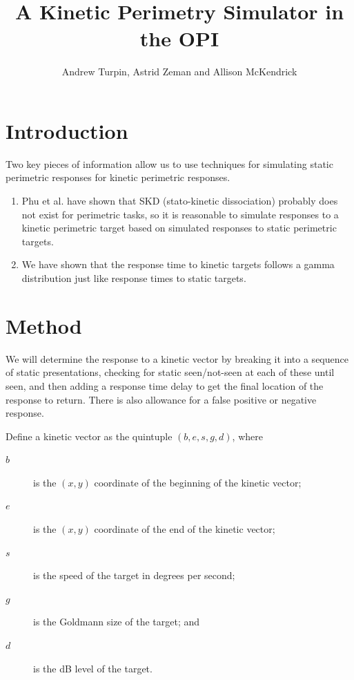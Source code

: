 \documentclass{article}
\title{A Kinetic Perimetry Simulator in the OPI}
\author{Andrew Turpin, Astrid Zeman and Allison McKendrick}
\begin{document}
\maketitle

\section{Introduction}

Two key pieces of information allow us to use techniques for simulating static perimetric
responses for kinetic perimetric responses.

\begin{enumerate}

\item Phu et al. have shown that SKD (stato-kinetic dissociation) probably
does not exist for perimetric tasks, so it is reasonable to simulate responses to a
kinetic perimetric target based on simulated responses to static perimetric targets.

\item We have shown that the response time to kinetic targets follows a gamma distribution
just like response times to static targets.

\end{enumerate}

\section{Method}

We will determine the response to a kinetic vector by breaking it into a sequence of
static presentations, checking for static seen/not-seen at each of these 
until seen, and then adding a response time delay to get the final 
location of the response to return.
There is also allowance for a false positive or negative response.

Define a kinetic vector as the quintuple $(b,e,s,g,d)$, where
\begin{description}
    \item[$b$] is the $(x,y)$ coordinate of the beginning of the kinetic vector;
    \item[$e$] is the $(x,y)$ coordinate of the end of the kinetic vector;
    \item[$s$] is the speed of the target in degrees per second; 
    \item[$g$] is the Goldmann size of the target; and 
    \item[$d$] is the dB level of the target.
\end{description}
\end{document}
